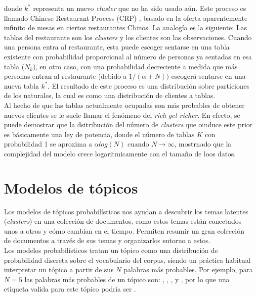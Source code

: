 \documentclass[letterpaper,12pt,oneside]{book} %
\begin{document}
donde $k^{*}$ representa un nuevo \textit{cluster} que no ha sido usado aún. Este proceso es llamado Chinese Restaurant Process (CRP) \citep{aldous1985exchangeability}, basado en la oferta aparentemente infinito de mesas en ciertos restaurantes Chinos. La analogía es la siguiente: Las tablas del restaurante son los \textit{clusters}  y los clientes son las observaciones. Cuando una persona entra al restaurante, esta puede escoger sentarse en una tabla existente con probabilidad proporcional al número de personas ya sentadas en esa tabla ($N_{k}$), en otro caso, con una probabilidad decreciente a medida que más personas entran al restaurante (debido a $1/(\alpha +N))$ escogerá sentarse en una nueva tabla $k^{*}$. El resultado de este proceso es una distribución sobre particiones de los naturales, la cual es como una distribución de clientes a tablas.\\

Al hecho de que las tablas actualmente ocupadas son más probables de obtener nuevos clientes se le suele llamar el fenómeno del \textit{rich get richer}. En efecto, se puede demostrar que la dsitribución del número de \textit{clusters} que oinduce este prior es básicamente una ley de potencia, donde el número de tablas $K$ con probabilidad 1 se aproxima a $\alpha log(N)$ cuando $N\rightarrow \infty$, mostrnado que la complejidad del modelo crece logaritmicamente con el tamaño de loos datos.

\section{Modelos de tópicos}

Los modelos de tópicos probabilísticos nos ayudan a descubrir los temas latentes (\textit{clusters}) en una colección de documentos, como estos temas están conectados unos a otros y cómo cambian en el tiempo. Permiten resumir un gran colección de documentos a través de sus temas y organizarlos entorno a estos.\\

Los modelos probabilísticos tratan un tópico como una distribución de probabilidad discreta sobre el vocabulario del corpus, siendo un práctica habitual interpretar un tópico a partir de sus $N$ palabras más probables. Por ejemplo, para $N=5$ las palabras más probables de un tópico son: , , ,  y , por lo que una etiqueta valida para este tópico podría ser .\\ 
\end{document}
